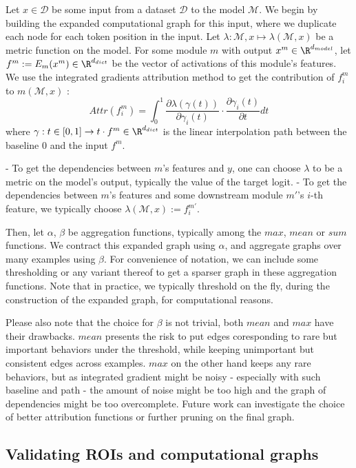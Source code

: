 \documentclass{article}
\begin{document}
Let $x \in \mathcal{D}$ be some input from a dataset $\mathcal{D}$ to the model $\mathcal{M}$. We begin by building the expanded computational graph for this input, where we duplicate each node for each token position in the input. Let $\lambda : \mathcal{M}, x \mapsto \lambda(\mathcal{M}, x)$ be a metric function on the model. For some module $m$ with output $x^m \in \R^{d_{model}}$, let $f^m := E_m(x^m) \in \R^{d_{dict}}$ be the vector of activations of this module's features. We use the integrated gradients attribution method to get the contribution of $f^m_i$ to $m(\mathcal{M}, x)$ :
$$ Attr(f^m_i) = \int_{0}^{1} \frac{\partial \lambda(\gamma(t))}{\partial \gamma_i(t)} \cdot \frac{\partial \gamma_i(t)}{\partial t} dt $$
where $\gamma : t \in [0, 1] \rightarrow t \cdot f^m \in \R^{d_{dict}}$ is the linear interpolation path between the baseline $0$ and the input $f^m$.

- To get the dependencies between $m$'s features and $y$, one can choose $\lambda$ to be a metric on the model's output, typically the value of the target logit.
- To get the dependencies between $m$'s features and some downstream module $m'$'s $i$-th feature, we typically choose $\lambda(\mathcal{M}, x) := f^{m'}_i$.

Then, let $\alpha$, $\beta$ be aggregation functions, typically among the $max$, $mean$ or $sum$ functions. We contract this expanded graph using $\alpha$, and aggregate graphs over many examples using $\beta$. For convenience of notation, we can include some thresholding or any variant thereof to get a sparser graph in these aggregation functions. Note that in practice, we typically threshold on the fly, during the construction of the expanded graph, for computational reasons.

Please also note that the choice for $\beta$ is not trivial, both $mean$ and $max$ have their drawbacks. $mean$ presents the risk to put edges coresponding to rare but important behaviors under the threshold, while keeping unimportant but consistent edges across examples. $max$ on the other hand keeps any rare behaviors, but as integrated gradient might be noisy - especially with such baseline and path - the amount of noise might be too high and the graph of dependencies might be too overcomplete. Future work can investigate the choice of better attribution functions or further pruning on the final graph.%

\subsection{Validating ROIs and computational graphs}
\end{document}
